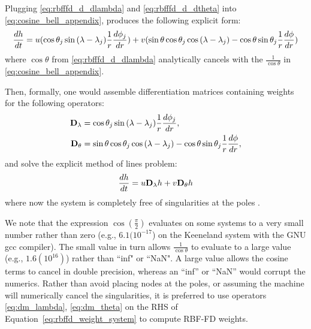Plugging \ref{eq:rbfffd_d_dlambda} and \ref{eq:rbfffd_d_dtheta} into \ref{eq:cosine_bell_appendix}, produces the following explicit form: 
\begin{align*}
\frac{d h}{d t} = u(\cos{\theta_j}\sin{(\lambda - \lambda_j)} \frac{1}{r} \frac{d \phi_j}{d r}) + v (\sin{\theta}\cos{\theta_j}\cos{(\lambda-\lambda_j)} - \cos{\theta}\sin{\theta_j} \frac{1}{r} \frac{d \phi}{d r}) 
\end{align*}
where $\cos{\theta}$ from \ref{eq:rbfffd_d_dlambda} analytically cancels with the $\frac{1}{\cos{\theta}}$ in \ref{eq:cosine_bell_appendix}.


Then, formally, one would assemble differentiation matrices containing weights for the following operators: 
\begin{align}
\mathbf{D}_\lambda & = \cos{\theta_j}\sin{(\lambda - \lambda_j)} \frac{1}{r} \frac{d \phi_j}{d r}, \label{eq:dm_lambda} \\
\mathbf{D}_\theta &=  \sin{\theta}\cos{\theta_j}\cos{(\lambda-\lambda_j)} - \cos{\theta}\sin{\theta_j} \frac{1}{r} \frac{d \phi}{d r}, \label{eq:dm_theta}
\end{align} 
and solve the explicit method of lines problem:
$$
\frac{d h}{d t} = u \mathbf{D}_\lambda h + v \mathbf{D}_\theta h
$$
where now the system is completely free of singularities at the poles \cite{FlyerWright09}. 

We note that the expression $\cos{(\frac{\pi}{2})}$ evaluates on some systems to a very small number rather than zero (e.g., $6.1(10^{-17}$) on the Keeneland system with the GNU gcc compiler). The small value in turn allows $\frac{1}{\cos{\theta}}$ to evaluate to a large value (e.g., $1.6(10^{16})$) rather than ``inf" or ``NaN". A large value allows the cosine terms to cancel in double precision, whereas an ``inf'' or ``NaN'' would corrupt the numerics. Rather than avoid placing nodes at the poles, or assuming the machine will numerically cancel the singularities, it is preferred to use operators \ref{eq:dm_lambda}, \ref{eq:dm_theta} on the RHS of Equation~\ref{eq:rbffd_weight_system} to compute RBF-FD weights. 